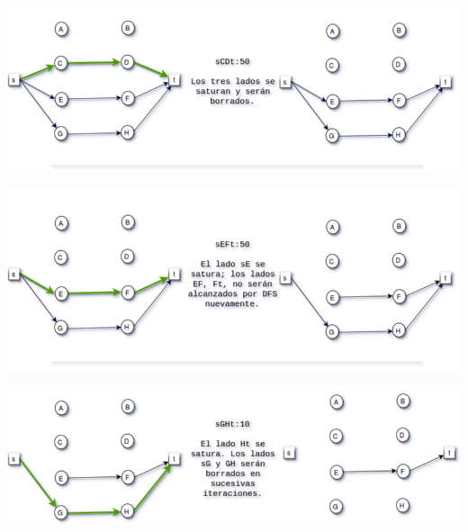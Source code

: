 \documentclass[10pt,a4paper]{article}
\begin{document}
\begin{center}

    \begin{adjustbox}{max size={\textwidth}{\textheight}}
        \includegraphics{definitions/dinic_ej_b.jpg}
        \end{adjustbox}
    
\end{center}

\begin{center}

    \begin{adjustbox}{max size={\textwidth}{\textheight}}
        \includegraphics{definitions/dinic_ej_c.jpg}
        \end{adjustbox}
    
\end{center}

\begin{center}

    \begin{adjustbox}{max size={\textwidth}{\textheight}}
        \includegraphics{definitions/dinic_ej_d.jpg}
        \end{adjustbox}
    
\end{center}
\end{document}
